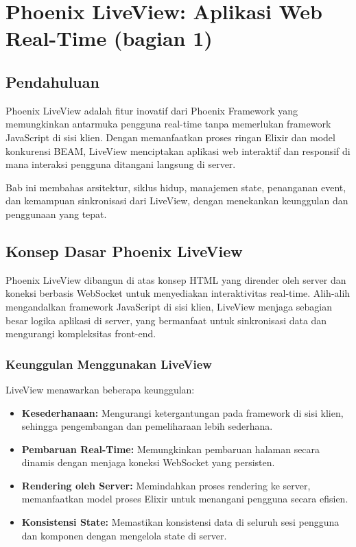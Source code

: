 \chapter{Phoenix LiveView: Aplikasi Web Real-Time (bagian 1)}
\section{Pendahuluan}
Phoenix LiveView adalah fitur inovatif dari Phoenix Framework yang memungkinkan antarmuka pengguna real-time tanpa memerlukan framework JavaScript di sisi klien. Dengan memanfaatkan proses ringan Elixir dan model konkurensi BEAM, LiveView menciptakan aplikasi web interaktif dan responsif di mana interaksi pengguna ditangani langsung di server.

Bab ini membahas arsitektur, siklus hidup, manajemen state, penanganan event, dan kemampuan sinkronisasi dari LiveView, dengan menekankan keunggulan dan penggunaan yang tepat.

\section{Konsep Dasar Phoenix LiveView}
Phoenix LiveView dibangun di atas konsep HTML yang dirender oleh server dan koneksi berbasis WebSocket untuk menyediakan interaktivitas real-time. Alih-alih mengandalkan framework JavaScript di sisi klien, LiveView menjaga sebagian besar logika aplikasi di server, yang bermanfaat untuk sinkronisasi data dan mengurangi kompleksitas front-end.

\subsection{Keunggulan Menggunakan LiveView}
LiveView menawarkan beberapa keunggulan:
\begin{itemize}
	\item \textbf{Kesederhanaan:} Mengurangi ketergantungan pada framework di sisi klien, sehingga pengembangan dan pemeliharaan lebih sederhana.
	\item \textbf{Pembaruan Real-Time:} Memungkinkan pembaruan halaman secara dinamis dengan menjaga koneksi WebSocket yang persisten.
	\item \textbf{Rendering oleh Server:} Memindahkan proses rendering ke server, memanfaatkan model proses Elixir untuk menangani pengguna secara efisien.
	\item \textbf{Konsistensi State:} Memastikan konsistensi data di seluruh sesi pengguna dan komponen dengan mengelola state di server.
\end{itemize}

